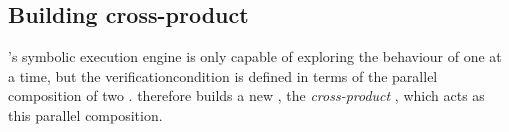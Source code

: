 \subsection{Building cross-product {\StateMachines}}
\label{sect:using:build_cross_product}


{\Technique}'s symbolic execution engine is only capable of exploring
the behaviour of one {\StateMachine} at a time, but the
\gls{verificationcondition} is defined in terms of the parallel
composition of two {\StateMachines}.  {\Technique} therefore builds a
new {\StateMachine}, the \emph{cross-product {\StateMachine}}, which
acts as this parallel composition.


